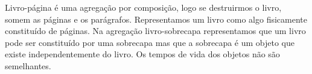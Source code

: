 \documentclass{lib/eng_softdoc}
\begin{document}
\vspace{0.5cm}
\answer Livro-página é uma agregação por composição, logo se destruirmos o livro, somem as
páginas e os parágrafos. Representamos um livro como algo fisicamente constituído de
páginas.
Na agregação livro-sobrecapa representamos que um livro pode ser constituído por uma
sobrecapa mas que a sobrecapa é um objeto que existe independentemente do livro. Os
tempos de vida dos objetos não são semelhantes.
\end{document}
